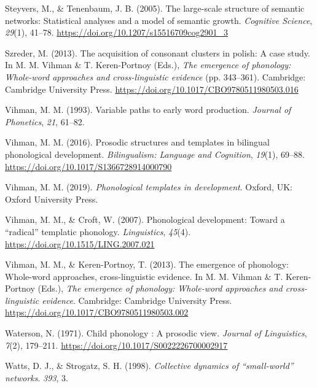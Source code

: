 \documentclass[
  man]{apa6}
\newlength{\cslhangindent}
\newlength{\cslentryspacingunit} %
\newenvironment{CSLReferences}[2] %
 {%
  \setlength{\parindent}{0pt}
  \ifodd #1
  \let\oldpar\par
  \def\par{\hangindent=\cslhangindent\oldpar}
  \fi
  \setlength{\parskip}{#2\cslentryspacingunit}
 }%
 {}
\begin{document}
\begin{CSLReferences}{1}{0}
\leavevmode{}%
Steyvers, M., \& Tenenbaum, J. B. (2005). The large-scale structure of semantic networks: Statistical analyses and a model of semantic growth. \emph{Cognitive Science}, \emph{29}(1), 41--78. \url{https://doi.org/10.1207/s15516709cog2901_3}

\leavevmode{}%
Szreder, M. (2013). The acquisition of consonant clusters in polish: A case study. In M. M. Vihman \& T. Keren-Portnoy (Eds.), \emph{The emergence of phonology: Whole-word approaches and cross-linguistic evidence} (pp. 343--361). Cambridge: Cambridge University Press. \url{https://doi.org/10.1017/CBO9780511980503.016}

\leavevmode{}%
Vihman, M. M. (1993). Variable paths to early word production. \emph{Journal of Phonetics}, \emph{21}, 61--82.

\leavevmode{}%
Vihman, M. M. (2016). Prosodic structures and templates in bilingual phonological development. \emph{Bilingualism: Language and Cognition}, \emph{19}(1), 69--88. \url{https://doi.org/10.1017/S1366728914000790}

\leavevmode{}%
Vihman, M. M. (2019). \emph{Phonological templates in development}. Oxford, {UK}: Oxford University Press.

\leavevmode{}%
Vihman, M. M., \& Croft, W. (2007). Phonological development: Toward a {``radical''} templatic phonology. \emph{Linguistics}, \emph{45}(4). \url{https://doi.org/10.1515/LING.2007.021}

\leavevmode{}%
Vihman, M. M., \& Keren-Portnoy, T. (2013). The emergence of phonology: Whole-word approaches, cross-linguistic evidence. In M. M. Vihman \& T. Keren-Portnoy (Eds.), \emph{The emergence of phonology: Whole-word approaches and cross-linguistic evidence}. Cambridge: Cambridge University Press. \url{https://doi.org/10.1017/CBO9780511980503.002}

\leavevmode{}%
Waterson, N. (1971). Child phonology : A prosodic view. \emph{Journal of Linguistics}, \emph{7}(2), 179--211. \url{https://doi.org/10.1017/S0022226700002917}

\leavevmode{}%
Watts, D. J., \& Strogatz, S. H. (1998). \emph{Collective dynamics of {``small-world''} networks}. \emph{393}, 3.


\end{CSLReferences}
\end{document}
